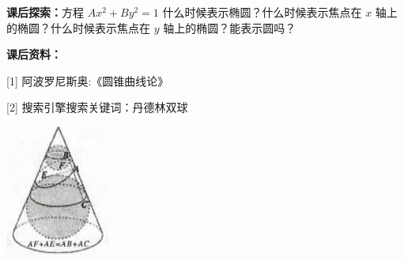 \documentclass[headheight=4.5cm,
			   margin=2cm,
			   titlewidth=0.6,
			   sansserif,
			   firstcolor=color1,
			   secondcolor=color2,
			   logo=myLogo.png,
			  ]{TelecomNancy}
\begin{document}

	\begin{minipage}{0.8\textwidth}
		\textbf{课后探索：}方程 $Ax^2 + By^2 =1$ 什么时候表示椭圆？什么时候表示焦点在 $x$ 轴上的椭圆？什么时候表示焦点在 $y$ 轴上的椭圆？能表示圆吗？

		\textbf{课后资料：}

		[1] 阿波罗尼斯奥:《圆锥曲线论》

		[2] 搜索引擎搜索关键词：丹德林双球
	\end{minipage}
	\begin{minipage}{0.2\textwidth}
		\includegraphics{e4.png}
	\end{minipage}
\end{document}
